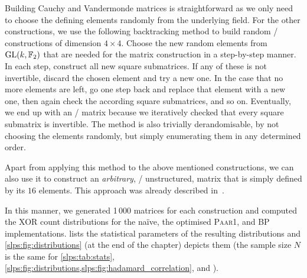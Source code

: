 Building Cauchy and Vandermonde matrices is straightforward as we only need to choose the defining elements randomly from the underlying field.
For the other constructions, we use the following backtracking method to build random \MDS/ constructions of dimension $4 \times 4$.
Choose the new random elements from $\mathrm{GL}(k, \mathbb{F}_2)$ that are needed for the matrix construction in a step-by-step manner.
In each step, construct all new square submatrices. If any of these is not invertible, discard the chosen element and try a new one. In the case that no more elements are left, go one step back and replace that element with a new one, then again check the according square submatrices, and so on.
Eventually, we end up with an \MDS/ matrix because we iteratively checked that every square submatrix is invertible.
The method is also trivially derandomisable, by not choosing the elements randomly, but simply enumerating them in any determined order.

Apart from applying this method to the above mentioned constructions, we can also use it to construct an \emph{arbitrary}, \ie/ unstructured, matrix that is simply defined by its $16$ elements.
This approach was already described in~\cite{ToSC:JPST17}.

In this manner, we generated 1\,000 matrices for each construction and computed the XOR count distributions for the na\"ive, the optimised \textsc{Paar1}, and \textsc{BP} implementations.
 lists the statistical parameters of the resulting distributions and \cref{slps:fig:distributions} (at the end of the chapter) depicts them (the sample size $N$ is the same for \cref{slps:tab:stats}, \cref{slps:fig:distributions,slps:fig:hadamard_correlation}, and
\cite[Appendix~A, Figures~3 to~6]{ToSC:KLSW17}%
).

